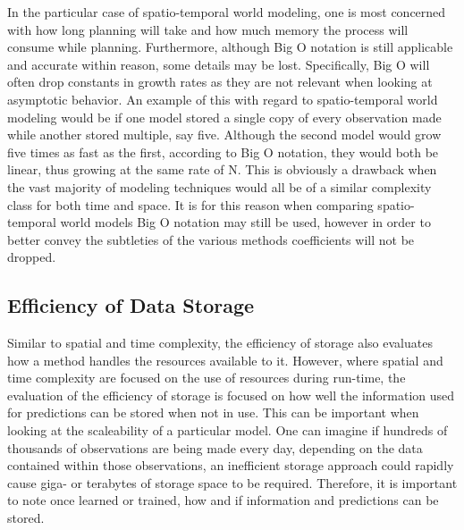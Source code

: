   In the particular case of spatio-temporal world modeling, one is most
  concerned with how long planning will take and how much memory the
  process will consume while planning. Furthermore, although Big O notation is
  still applicable and accurate within reason, some details may be lost.
  Specifically, Big O will often drop constants in growth rates as they are
  not relevant when looking at asymptotic behavior. An example of this with
  regard to spatio-temporal world modeling would be if one model stored a
  single copy of every observation made while another stored multiple, say
  five. Although the second model would grow five times as fast as the first,
  according to Big O notation, they would both be linear, thus growing at the
  same rate of N. This is obviously a drawback when the vast majority of
  modeling techniques would all be of a similar complexity class for both time
  and space. It is for this reason when comparing spatio-temporal world
  models Big O notation may still be used, however in order to better convey
  the subtleties of the various methods coefficients will not be dropped.


  \subsection{ Efficiency of Data Storage }
  Similar to spatial and time complexity, the efficiency of storage also
  evaluates how a method handles the resources available to it. However, where
  spatial and time complexity are focused on the use of resources during
  run-time, the evaluation of the efficiency of storage is focused on how well
  the information used for predictions can be stored when not in use. This
  can be important when looking at the scaleability of a particular model. One
  can imagine if hundreds of thousands of observations are being made every
  day, depending on the data contained within those observations, an
  inefficient storage approach could rapidly cause giga- or terabytes of storage
  space to be required. Therefore, it is important to note once learned or trained,
  how and if information and predictions can be stored.

